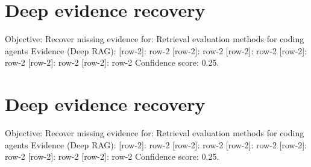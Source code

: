\documentclass[conference]{IEEEtran}
\begin{document}
\section{Deep evidence recovery}
Objective: Recover missing evidence for: Retrieval evaluation methods for coding agents
Evidence (Deep RAG):
[row-2]: row-2
[row-2]: row-2
[row-2]: row-2
[row-2]: row-2
[row-2]: row-2
[row-2]: row-2
Confidence score: 0.25. \cite{f1_fake_1,f1_fake_2,t4_fake_2}

\section{Deep evidence recovery}
Objective: Recover missing evidence for: Retrieval evaluation methods for coding agents
Evidence (Deep RAG):
[row-2]: row-2
[row-2]: row-2
[row-2]: row-2
[row-2]: row-2
[row-2]: row-2
[row-2]: row-2
Confidence score: 0.25. \cite{t3_fake_2,f2_fake_2,t2_fake_2}

\
\

\
\end{document}
